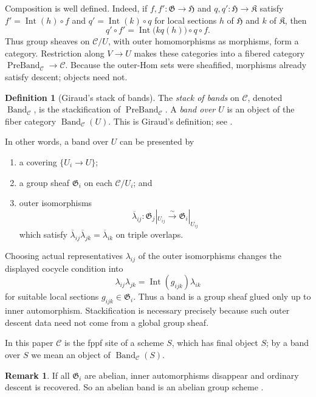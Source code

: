 \documentclass[11pt,reqno]{amsart}
\numberwithin{equation}{section}
\theoremstyle{plain}
\theoremstyle{definition}
\newtheorem{defi}[prop]{Definition}
\newtheorem{rema}[prop]{Remark}
\def\fG{{\mathfrak G}}
\def\fH{{\mathfrak H}}
\def\fK{{\mathfrak K}}
\begin{document}
Composition is well defined.  Indeed, if
$f,f':\fG\to\fH$ and $q,q':\fH\to\fK$ satisfy
$f'=\operatorname{Int}(h)\circ f$ and
$q'=\operatorname{Int}(k)\circ q$ for local sections $h$ of $\fH$
and $k$ of $\fK$, then
\[
q'\circ f'
=
\operatorname{Int}\bigl(kq(h)\bigr)\circ q\circ f.
\]
Thus group sheaves on $\mathcal C/U$, with outer homomorphisms as
morphisms, form a category.  Restriction along $V\to U$ makes these
categories into a fibered category
$\operatorname{PreBand}_{\mathcal C}\to\mathcal C$.  Because the
outer-Hom sets were sheafified, morphisms already satisfy descent; objects
need not.

\begin{defi}[Giraud's stack of bands]\label{def:stack-of-bands}
The \emph{stack of bands} on $\mathcal C$, denoted
$\operatorname{Band}_{\mathcal C}$, is the stackification of
$\operatorname{PreBand}_{\mathcal C}$.  A \emph{band over $U$} is an
object of the fiber category $\operatorname{Band}_{\mathcal C}(U)$.
This is Giraud's definition; see
\cite[Chapter~IV, D\'efinition~1.1.6]{Giraud}.
\end{defi}

In other words, a band over $U$ can be presented by
\begin{enumerate}[label=\textup{(\roman*)}]
\item a covering $\{U_i\to U\}$;
\item a group sheaf $\fG_i$ on each $\mathcal C/U_i$; and
\item outer isomorphisms
\[
\overline\lambda_{ij}:
\fG_j|_{U_{ij}}\xrightarrow{\sim}\fG_i|_{U_{ij}}
\]
which satisfy
$\overline\lambda_{ij}\overline\lambda_{jk}
=\overline\lambda_{ik}$ on triple overlaps.
\end{enumerate}
Choosing actual representatives $\lambda_{ij}$ of the
outer isomorphisms changes the displayed cocycle condition into
\[
\lambda_{ij}\lambda_{jk}
=\operatorname{Int}(g_{ijk})\lambda_{ik}
\]
for suitable local sections $g_{ijk}\in\fG_i$.  Thus a band is a group
sheaf glued only up to inner automorphism.  Stackification is necessary
precisely because such outer descent data need not come from a global
group sheaf.

In this paper $\mathcal C$ is the fppf site of a scheme $S$, which has
final object $S$; by a band over $S$ we mean an object of
$\operatorname{Band}_{\mathcal C}(S)$.

\begin{rema}
If all $\fG_i$ are abelian, inner automorphisms disappear and ordinary
descent is recovered. So an abelian band is an abelian group scheme \cite[Chapter~IV, Proposition~1.2.3]{Giraud}.
\end{rema}
\end{document}
